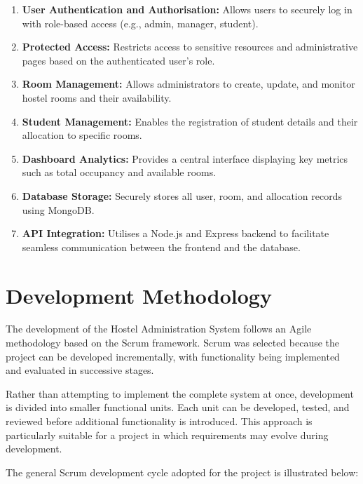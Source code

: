 \begin{enumerate}
    \item \textbf{User Authentication and Authorisation:} Allows users to securely log in with role-based access (e.g., admin, manager, student).
    
    \item \textbf{Protected Access:} Restricts access to sensitive resources and administrative pages based on the authenticated user's role.
    
    \item \textbf{Room Management:} Allows administrators to create, update, and monitor hostel rooms and their availability.
    
    \item \textbf{Student Management:} Enables the registration of student details and their allocation to specific rooms.
    
    \item \textbf{Dashboard Analytics:} Provides a central interface displaying key metrics such as total occupancy and available rooms.
    
    \item \textbf{Database Storage:} Securely stores all user, room, and allocation records using MongoDB.
    
    \item \textbf{API Integration:} Utilises a Node.js and Express backend to facilitate seamless communication between the frontend and the database.
\end{enumerate}

\section{Development Methodology}

The development of the Hostel Administration System follows an Agile methodology based on the Scrum framework. Scrum was selected because the project can be developed incrementally, with functionality being implemented and evaluated in successive stages.

Rather than attempting to implement the complete system at once, development is divided into smaller functional units. Each unit can be developed, tested, and reviewed before additional functionality is introduced. This approach is particularly suitable for a project in which requirements may evolve during development.

The general Scrum development cycle adopted for the project is illustrated below:

